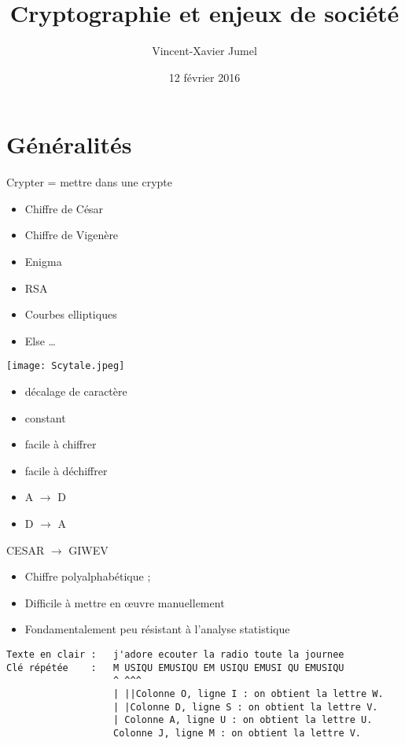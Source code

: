 \documentclass[french]{article}
\title{Cryptographie et enjeux de société}
\author[jumelvin@jbs-ndc93.com]{Vincent-Xavier Jumel}
\date{12 février 2016}
\begin{document}
\section{Généralités}

  \maketitle

  Crypter = mettre dans une crypte

  \begin{itemize}
    \item Chiffre de César
    \item Chiffre de Vigenère
    \item Enigma
    \item RSA
    \item Courbes elliptiques
    \item Else …
  \end{itemize}

    \texttt{[image: Scytale.jpeg]}

  \begin{multicols}{2}
      \begin{itemize}
        \item décalage de caractère
        \item constant
        \item facile à chiffrer
        \item facile à déchiffrer
      \end{itemize}
      \begin{itemize}
        \item A $\rightarrow$ D
        \item D $\rightarrow$ A
      \end{itemize}
      CESAR $\rightarrow$ GIWEV
  \end{multicols}

    \begin{itemize}
      \item Chiffre polyalphabétique ;
      \item Difficile à mettre en œuvre manuellement
      \item Fondamentalement peu résistant à l'analyse statistique
    \end{itemize}
    \scriptsize
    \begin{verbatim}
Texte en clair :   j'adore ecouter la radio toute la journee
Clé répétée    :   M USIQU EMUSIQU EM USIQU EMUSI QU EMUSIQU
                   ^ ^^^
                   | ||Colonne O, ligne I : on obtient la lettre W.
                   | |Colonne D, ligne S : on obtient la lettre V.
                   | Colonne A, ligne U : on obtient la lettre U.
                   Colonne J, ligne M : on obtient la lettre V.
    \end{verbatim}
  \normalsize
\end{document}

